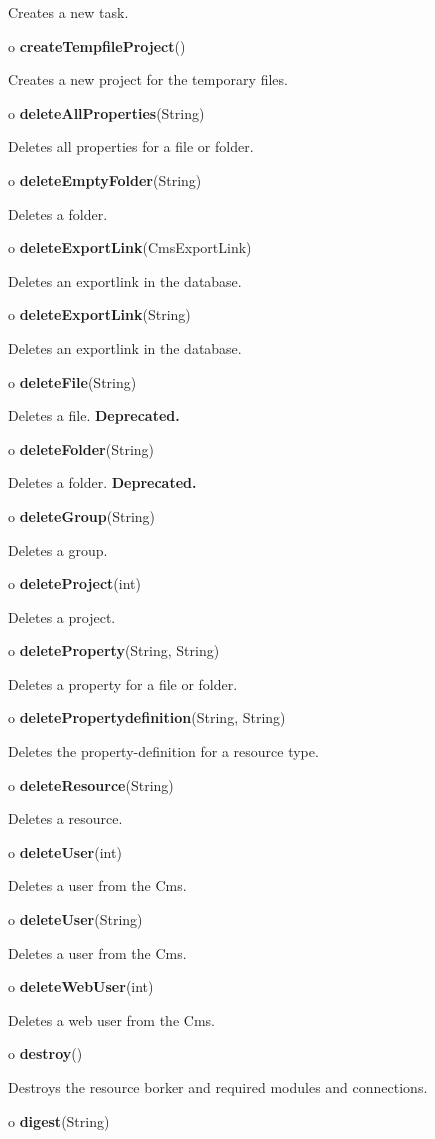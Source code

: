 \begin{description}
Creates a new task.  
\item o {\bf createTempfileProject}()  

Creates a new project for the temporary files.  
\item o {\bf deleteAllProperties}(String)  

Deletes all properties for a file or folder.  
\item o {\bf deleteEmptyFolder}(String)  

Deletes a folder.  
\item o {\bf deleteExportLink}(CmsExportLink)  

Deletes an exportlink in the database.  
\item o {\bf deleteExportLink}(String)  

Deletes an exportlink in the database.  
\item o {\bf deleteFile}(String)  

Deletes a file. {\bf Deprecated.}  
\item o {\bf deleteFolder}(String)  

Deletes a folder. {\bf Deprecated.}  
\item o {\bf deleteGroup}(String)  

Deletes a group.  
\item o {\bf deleteProject}(int)  

Deletes a project.  
\item o {\bf deleteProperty}(String, String)  

Deletes a property for a file or folder.  
\item o {\bf deletePropertydefinition}(String, String)  

Deletes the property-definition for a resource type.  
\item o {\bf deleteResource}(String)  

Deletes a resource.  
\item o {\bf deleteUser}(int)  

Deletes a user from the Cms.  
\item o {\bf deleteUser}(String)  

Deletes a user from the Cms.  
\item o {\bf deleteWebUser}(int)  

Deletes a web user from the Cms.  
\item o {\bf destroy}()  

Destroys the resource borker and required modules and connections.  
\item o {\bf digest}(String)  


\end{description}
